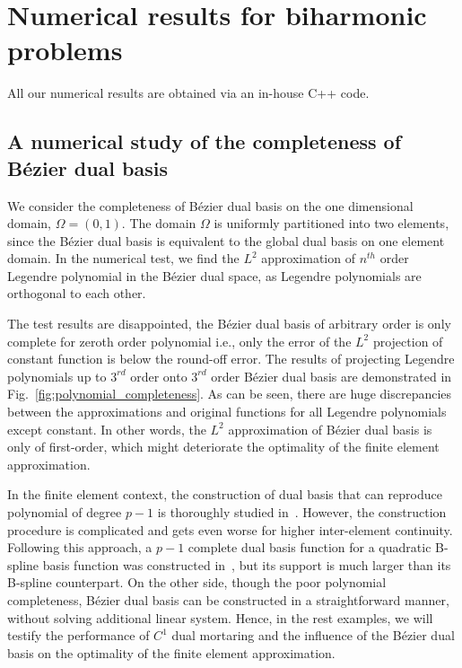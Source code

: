 \documentclass[preprint,12pt]{elsarticle}
\theoremstyle{remark}
\begin{document}
\section{Numerical results for biharmonic problems}
All our numerical results are obtained via an in-house C++ code.
\subsection{A numerical study of the completeness of B\'ezier dual basis}
We consider the completeness of B\'ezier dual basis on the one dimensional domain, $\Omega=(0,1)$. The domain $\Omega$ is uniformly partitioned into two elements, since the B\'ezier dual basis is equivalent to the global dual basis on one element domain. In the numerical test, we find the $L^2$ approximation of $n^{th}$ order Legendre polynomial in the B\'ezier dual space, as Legendre polynomials are orthogonal to each other.\par

The test results are disappointed, the B\'ezier dual basis of arbitrary order is only complete for zeroth order polynomial i.e., only the error of the $L^2$ projection of constant function is below the round-off error. The results of projecting Legendre polynomials up to $3^{rd}$ order onto $3^{rd}$ order B\'ezier dual basis are demonstrated in Fig.~\ref{fig:polynomial_completeness}. As can be seen, there are huge discrepancies between the approximations and original functions for all Legendre polynomials except constant. In other words, the $L^2$ approximation of B\'ezier dual basis is only of first-order, which might deteriorate the optimality of the finite element approximation. \par

In the finite element context, the construction of dual basis that can reproduce polynomial of degree $p-1$ is thoroughly studied in~\cite{oswald2001polynomial}. However, the construction procedure is complicated and gets even worse for higher inter-element continuity. Following this approach, a $p-1$ complete dual basis function for a quadratic B-spline basis function was constructed in~\cite{brivadis_isogeometric_2015}, but its support is much larger than its B-spline counterpart. On the other side, though the poor polynomial completeness, B\'ezier dual basis can be constructed in a straightforward manner, without solving additional linear system. Hence, in the rest examples, we will testify the performance of $C^1$ dual mortaring and the influence of the B\'ezier dual basis on the optimality of the finite element approximation.
\end{document}
